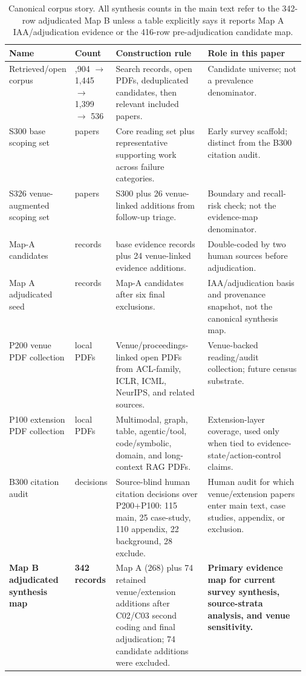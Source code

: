 \documentclass[11pt]{article}
\begin{document}
\begin{table}[t]
\centering
\scriptsize
\renewcommand{\arraystretch}{0.88}
\begin{tabularx}{\linewidth}{>{\raggedright\arraybackslash}p{0.15\linewidth}>{\raggedright\arraybackslash}p{0.11\linewidth}>{\raggedright\arraybackslash}p{0.31\linewidth}X}
\toprule
\textbf{Name} & \textbf{Count} & \textbf{Construction rule} & \textbf{Role in this paper} \\
\midrule
Retrieved/open corpus & 1,904 $\rightarrow$ 1,445 $\rightarrow$ 1,399 $\rightarrow$ 536 & Search records, open PDFs, deduplicated candidates, then relevant included papers. & Candidate universe; not a prevalence denominator. \\
S300 base scoping set & 300 papers & Core reading set plus representative supporting work across failure categories. & Early survey scaffold; distinct from the B300 citation audit. \\
S326 venue-augmented scoping set & 326 papers & S300 plus 26 venue-linked additions from follow-up triage. & Boundary and recall-risk check; not the evidence-map denominator. \\
Map-A candidates & 274 records & 250 base evidence records plus 24 venue-linked evidence additions. & Double-coded by two human sources before adjudication. \\
Map A adjudicated seed & 268 records & Map-A candidates after six final exclusions. & IAA/adjudication basis and provenance snapshot, not the canonical synthesis map. \\
P200 venue PDF collection & 200 local PDFs & Venue/proceedings-linked open PDFs from ACL-family, ICLR, ICML, NeurIPS, and related sources. & Venue-backed reading/audit collection; future census substrate. \\
P100 extension PDF collection & 100 local PDFs & Multimodal, graph, table, agentic/tool, code/symbolic, domain, and long-context RAG PDFs. & Extension-layer coverage, used only when tied to evidence-state/action-control claims. \\
B300 citation audit & 300 decisions & Source-blind human citation decisions over P200+P100: 115 main, 25 case-study, 110 appendix, 22 background, 28 exclude. & Human audit for which venue/extension papers enter main text, case studies, appendix, or exclusion. \\
\textbf{Map B adjudicated synthesis map} & \textbf{342 records} & Map A (268) plus 74 retained venue/extension additions after C02/C03 second coding and final adjudication; 74 candidate additions were excluded. & \textbf{Primary evidence map for current survey synthesis, source-strata analysis, and venue sensitivity.} \\
\bottomrule
\end{tabularx}
\caption{Canonical corpus story. All synthesis counts in the main text refer to the 342-row adjudicated Map B unless a table explicitly says it reports Map A IAA/adjudication evidence or the 416-row pre-adjudication candidate map.}
\label{tab:canonical-corpus-story}
\end{table}
\end{document}
